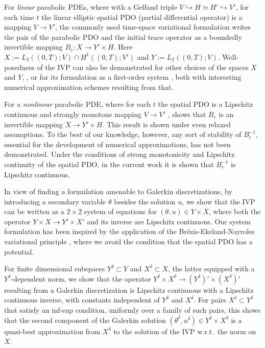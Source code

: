 \documentclass{amsart}
\numberwithin{equation}{section}
\newcommand{\1}{\mathbb 1}
\begin{document}
For \emph{linear} parabolic PDEs, where with a Gelfand triple $V \hookrightarrow H \simeq H' \hookrightarrow V'$,
for each time $t$ the linear elliptic spatial PDO (partial differential operator) is a mapping $V \rightarrow V'$, the commonly used time-space variational formulation writes the pair of the parabolic PDO and the initial trace operator 
as a boundedly invertible mapping $B_e \colon X \rightarrow Y' \times H$. Here $X:=L_2((0,T);V) \cap H^1((0,T);V')$ and $Y:=L_2((0,T);V)$. Well-posedness of the IVP can also be demonstrated for other choices of the spaces $X$ and $Y$, \cite{247.155,249.3}, or for its formulation as a first-order system \cite{75.257,75.28}, both with interesting numerical approximation schemes resulting from that.

For a \emph{nonlinear} parabolic PDE, where for each $t$ the spatial PDO is a Lipschitz continuous and strongly monotone mapping $V \rightarrow V'$ ,
\cite{318.3} shows that $B_e$ is an invertible mapping $X \rightarrow Y' \times H$. This result is shown under even relaxed assumptions.
To the best of our knowledge, however, any sort of stability of $B_e^{-1}$, essential for the development of numerical approximations, has not been demonstrated.
Under the conditions of strong monotonicity and Lipschitz continuity of the spatial PDO, in the current work it is shown that $B_e^{-1}$ is Lipschitz continuous.

In view of finding a formulation amenable to Galerkin discretizations, by introducing a secondary variable $\theta$ besides the solution $u$, we show that the IVP can be written as a $2 \times 2$ system of equations for $(\theta,u) \in Y \times X$, where both the operator $Y \times X \rightarrow Y' \times X'$
and its inverse are Lipschitz continuous. 
Our system formulation has been inspired by the application of the Br\'{e}zis-Ekeland-Nayroles variational principle \cite{35.81,233.5}, where we avoid the condition that the spatial PDO has a potential.

For finite dimensional subspaces $Y^\delta \subset Y$ and $X^\delta \subset X$, the latter equipped with a $Y^\delta$-dependent norm,
we show that the operator $Y^\delta \times X^\delta \rightarrow (Y^\delta)' \times (X^\delta)'$ resulting from a Galerkin discretization
 is Lipschitz continuous with a Lipschitz continuous inverse, with constants independent of $Y^\delta$ and $X^\delta$.
For pairs $X^\delta \subset Y^\delta$ that satisfy an inf-sup condition, uniformly over a family of such pairs, this shows that the second component of the Galerkin solution $(\theta^\delta,u^\delta) \in Y^\delta \times X^\delta$ is a quasi-best approximation from $X^\delta$ to the solution of the IVP w.r.t.~the norm on $X$.
\end{document}
